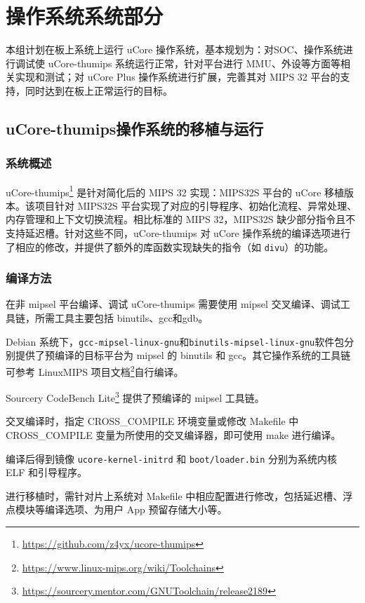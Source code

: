 \chapter{操作系统系统部分}
本组计划在板上系统上运行 uCore 操作系统，基本规划为：对SOC、操作系统进行调试使 uCore-thumips 系统运行正常，针对平台进行 MMU、外设等方面等相关实现和测试；对 uCore Plus 操作系统进行扩展，完善其对 MIPS 32 平台的支持，同时达到在板上正常运行的目标。

\section{uCore-thumips操作系统的移植与运行}

\subsection{系统概述}

uCore-thumips\footnote{\url{https://github.com/z4yx/ucore-thumips}} 是针对简化后的 MIPS 32 实现：MIPS32S 平台的 uCore 移植版本。该项目针对 MIPS32S 平台实现了对应的引导程序、初始化流程、异常处理、内存管理和上下文切换流程。相比标准的 MIPS 32，MIPS32S 缺少部分指令且不支持延迟槽。针对这些不同，uCore-thumips 对 uCore 操作系统的编译选项进行了相应的修改，并提供了额外的库函数实现缺失的指令（如 \texttt{divu}）的功能。

\subsection{编译方法}
在非 mipsel 平台编译、调试 uCore-thumips 需要使用 mipsel 交叉编译、调试工具链，所需工具主要包括 binutils、gcc和gdb。

Debian 系统下，\texttt{gcc-mipsel-linux-gnu}和\texttt{binutils-mipsel-linux-gnu}软件包分别提供了预编译的目标平台为 mipsel 的 binutils 和 gcc。其它操作系统的工具链可参考 LinuxMIPS 项目文档\footnote{\url{https://www.linux-mips.org/wiki/Toolchains}}自行编译。

Sourcery CodeBench Lite\footnote{\url{https://sourcery.mentor.com/GNUToolchain/release2189}} 提供了预编译的 mipsel 工具链。 

交叉编译时，指定 CROSS\_COMPILE 环境变量或修改 Makefile 中 CROSS\_COMPILE 变量为所使用的交叉编译器，即可使用 make 进行编译。

编译后得到镜像 \texttt{ucore-kernel-initrd} 和 \texttt{boot/loader.bin} 分别为系统内核 ELF 和引导程序。

进行移植时，需针对片上系统对 Makefile 中相应配置进行修改，包括延迟槽、浮点模块等编译选项、为用户 App 预留存储大小等。


